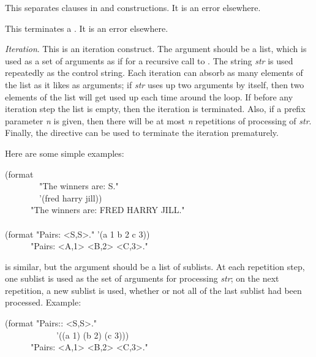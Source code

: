 \begin{flushdesc}
\item[\cd{{\Xtilde};}]
This separates clauses in \cd{{\Xtilde}{\Xlbracket}} and \cd{{\Xtilde}<}
constructions.  It is an error elsewhere.

\item[\cd{{\Xtilde}{\Xrbracket}}]
This terminates a \cd{{\Xtilde}{\Xlbracket}}.  It is an error elsewhere.

\item[\cd{{\Xtilde}{\Xlbrace}\emph{str}{\Xtilde}{\Xrbrace}}]
\emph{Iteration}.
This is an iteration construct.  The argument should be a list,
which is used as a set of arguments as if for a recursive call to .
The string \emph{str} is used repeatedly as the control string.
Each iteration can absorb as many elements of the list as it likes
as arguments;
if \emph{str} uses up two arguments by itself, then two elements of the
list will get used up each time around the loop.
If before any iteration step the list is empty, then the iteration is terminated.
Also, if a prefix parameter \emph{n} is given, then there will be at most \emph{n}
repetitions of processing of \emph{str}.  Finally, the
\cd{{\Xtilde}{\Xcircumflex}} directive can be used to terminate the iteration
prematurely.

Here are some simple examples:
\begin{lisp}
(format {\false} \\
~~~~~~~~"The winners are:{\Xtilde}{\Xlbrace} {\Xtilde}S{\Xtilde}{\Xrbrace}." \\
~~~~~~~~'(fred harry jill)) \\
~~~~~\EV\ "The winners are: FRED HARRY JILL." \\
\\
(format {\false} "Pairs:{\Xtilde}{\Xlbrace} <{\Xtilde}S,{\Xtilde}S>{\Xtilde}{\Xrbrace}." '(a 1 b 2 c 3)) \\
~~~~~\EV\ "Pairs: <A,1> <B,2> <C,3>."
\end{lisp}

 is similar, but the argument should be a list of sublists.
At each repetition step, one sublist is used as the set of arguments for
processing \emph{str}; on the next repetition, a new sublist is used, whether
or not all of the last sublist had been processed.  Example:
\begin{lisp}
(format {\false} "Pairs:{\Xtilde}:{\Xlbrace} <{\Xtilde}S,{\Xtilde}S>{\Xtilde}{\Xrbrace}." \\
~~~~~~~~~~~~'((a 1) (b 2) (c 3))) \\
~~~~~\EV\ "Pairs: <A,1> <B,2> <C,3>."
\end{lisp}


\end{flushdesc}
